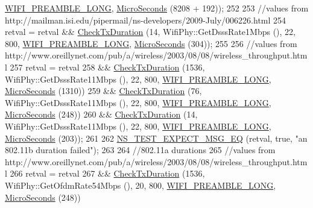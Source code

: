 \begin{DoxyCode}
      \hyperlink{group__wifi_gga5e94a56cb338a14ffbbb19c6a41251eba12f3d9468d1630bd38bbef20df1e3eda}{WIFI\_PREAMBLE\_LONG}, \hyperlink{group__timecivil_ga17465a639c8d1464e76538afdd78a9f0}{MicroSeconds} (8208 + 192));
252 
253   \textcolor{comment}{//values from http://mailman.isi.edu/pipermail/ns-developers/2009-July/006226.html}
254   retval = retval && \hyperlink{classTxDurationTest_ac86b852957ecf1a1bed4f4e48debb30e}{CheckTxDuration} (14, WifiPhy::GetDsssRate1Mbps (), 22, 800, 
      \hyperlink{group__wifi_gga5e94a56cb338a14ffbbb19c6a41251eba12f3d9468d1630bd38bbef20df1e3eda}{WIFI\_PREAMBLE\_LONG}, \hyperlink{group__timecivil_ga17465a639c8d1464e76538afdd78a9f0}{MicroSeconds} (304));
255 
256   \textcolor{comment}{//values from http://www.oreillynet.com/pub/a/wireless/2003/08/08/wireless\_throughput.html}
257   retval = retval
258     && \hyperlink{classTxDurationTest_ac86b852957ecf1a1bed4f4e48debb30e}{CheckTxDuration} (1536, WifiPhy::GetDsssRate11Mbps (), 22, 800, 
      \hyperlink{group__wifi_gga5e94a56cb338a14ffbbb19c6a41251eba12f3d9468d1630bd38bbef20df1e3eda}{WIFI\_PREAMBLE\_LONG}, \hyperlink{group__timecivil_ga17465a639c8d1464e76538afdd78a9f0}{MicroSeconds} (1310))
259     && \hyperlink{classTxDurationTest_ac86b852957ecf1a1bed4f4e48debb30e}{CheckTxDuration} (76, WifiPhy::GetDsssRate11Mbps (), 22, 800, 
      \hyperlink{group__wifi_gga5e94a56cb338a14ffbbb19c6a41251eba12f3d9468d1630bd38bbef20df1e3eda}{WIFI\_PREAMBLE\_LONG}, \hyperlink{group__timecivil_ga17465a639c8d1464e76538afdd78a9f0}{MicroSeconds} (248))
260     && \hyperlink{classTxDurationTest_ac86b852957ecf1a1bed4f4e48debb30e}{CheckTxDuration} (14, WifiPhy::GetDsssRate11Mbps (), 22, 800, 
      \hyperlink{group__wifi_gga5e94a56cb338a14ffbbb19c6a41251eba12f3d9468d1630bd38bbef20df1e3eda}{WIFI\_PREAMBLE\_LONG}, \hyperlink{group__timecivil_ga17465a639c8d1464e76538afdd78a9f0}{MicroSeconds} (203));
261 
262   \hyperlink{group__testing_ga7304ba46a28d8cf08dfdfd6499cf7068}{NS\_TEST\_EXPECT\_MSG\_EQ} (retval, \textcolor{keyword}{true}, \textcolor{stringliteral}{"an 802.11b duration failed"});
263 
264   \textcolor{comment}{//802.11a durations}
265   \textcolor{comment}{//values from http://www.oreillynet.com/pub/a/wireless/2003/08/08/wireless\_throughput.html}
266   retval = retval
267     && \hyperlink{classTxDurationTest_ac86b852957ecf1a1bed4f4e48debb30e}{CheckTxDuration} (1536, WifiPhy::GetOfdmRate54Mbps (), 20, 800, 
      \hyperlink{group__wifi_gga5e94a56cb338a14ffbbb19c6a41251eba12f3d9468d1630bd38bbef20df1e3eda}{WIFI\_PREAMBLE\_LONG}, \hyperlink{group__timecivil_ga17465a639c8d1464e76538afdd78a9f0}{MicroSeconds} (248))

\end{DoxyCode}
